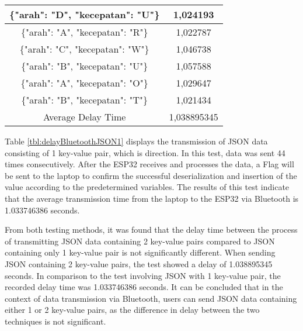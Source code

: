 \begin{table}[!ht]
\begin{tabular}{|c|c|}
  \{"arah": "D", "kecepatan": "U"\} & 1,024193    \\ \hline
  \{"arah": "A", "kecepatan": "R"\} & 1,022787    \\ \hline
  \{"arah": "C", "kecepatan": "W"\} & 1,046738    \\ \hline
  \{"arah": "B", "kecepatan": "U"\} & 1,057588    \\ \hline
  \{"arah": "A", "kecepatan": "O"\} & 1,029647    \\ \hline
  \{"arah": "B", "kecepatan": "T"\} & 1,021434    \\ \hline
  Average Delay Time                & 1,038895345 \\ \hline
  \end{tabular}
  \end{table}

Table \ref{tbl:delayBluetoothJSON1} displays the transmission of JSON data consisting of 1 key-value pair, which is direction. In this test, data was sent 44 times consecutively. After the ESP32 receives and processes the data, a Flag will be sent to the laptop to confirm the successful deserialization and insertion of the value according to the predetermined variables. The results of this test indicate that the average transmission time from the laptop to the ESP32 via Bluetooth is 1.033746386 seconds.

From both testing methods, it was found that the delay time between the process of transmitting JSON data containing 2 key-value pairs compared to JSON containing only 1 key-value pair is not significantly different. When sending JSON containing 2 key-value pairs, the test showed a delay of 1.038895345 seconds. In comparison to the test involving JSON with 1 key-value pair, the recorded delay time was 1.033746386 seconds. It can be concluded that in the context of data transmission via Bluetooth, users can send JSON data containing either 1 or 2 key-value pairs, as the difference in delay between the two techniques is not significant.


